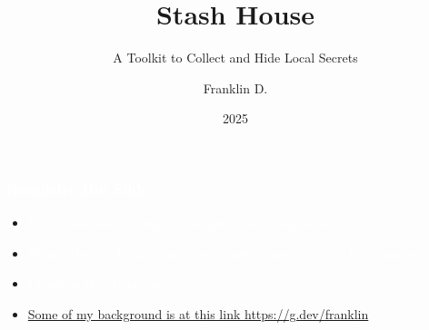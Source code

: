 \documentclass[aspectratio=169]{beamer}
\title{Stash House}
\subtitle{A Toolkit to Collect and Hide Local Secrets}
\author{Franklin D.}
\institute{Recreational Computing Institute}
\date{2025}
\begin{document}
{
%
\begin{frame}
	\titlepage
\end{frame}
}


{
\begin{frame}
	\frametitle{\textcolor{white}{Requisite Bio Slide}}
	\begin{itemize}
		\item \textcolor{white}{I have been doing things to computers for a long time.}
		\item \textcolor{white}{During the day I am a computer security consultant at a big company.}
		\item \textcolor{white}{I teach in the afternoons.}
		\item \textcolor{white}{\href{https://g.dev/franklin}{Some of my background is at this link https://g.dev/franklin}}
	\end{itemize}
\end{frame}
}
\end{document}
